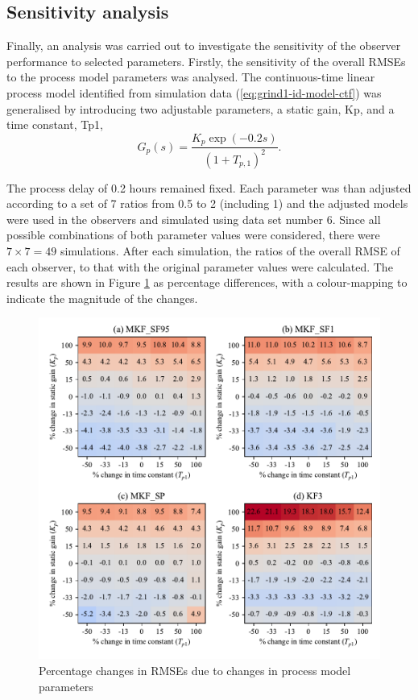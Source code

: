 \subsection{Sensitivity analysis} \label{sec:grind1-sensitivity-analysis}
Finally, an analysis was carried out to investigate the sensitivity of the observer performance to selected parameters. Firstly, the sensitivity of the overall \gls{RMSE}s to the process model parameters was analysed. The continuous-time linear process model identified from simulation data (\ref{eq:grind1-id-model-ctf}) was generalised by introducing two adjustable parameters, a static gain, \gls{Kp}, and a time constant, \gls{Tp1},
\begin{equation} \label{eq:grind1-id-model-ctf}
	G_p(s)= \frac{K_p \exp(-0.2s)}{(1 + T_{p,1})^2}.
\end{equation}

The process delay of 0.2 hours remained fixed. Each parameter was than adjusted according to a set of 7 ratios from 0.5 to 2 (including 1) and the adjusted models were used in the observers and simulated using data set number 6. Since all possible combinations of both parameter values were considered, there were $7\times7=49$ simulations. After each simulation, the ratios of the overall \gls{RMSE} of each observer, to that with the original parameter values were calculated. The results are shown in Figure \ref{fig:grind1-obs-sim-sens-model-y-est} as percentage differences, with a colour-mapping to indicate the magnitude of the changes.
\begin{figure}[htp]
	\centering
	\includegraphics[width=15cm]{images/rod_obs_sim_sens_sys_4obs_RMSE_y_est.pdf}
	\caption{Percentage changes in \gls{RMSE}s due to changes in process model parameters}
	\label{fig:grind1-obs-sim-sens-model-y-est}
\end{figure}

